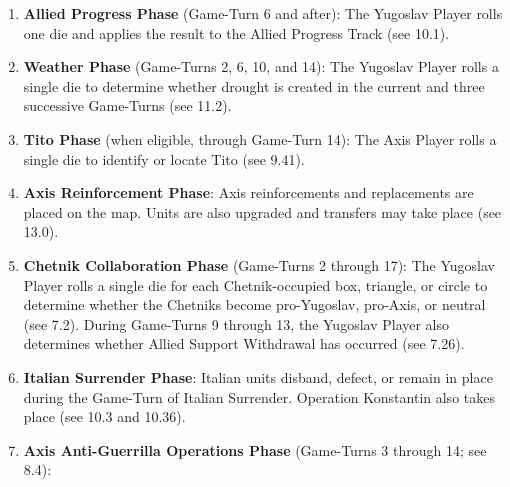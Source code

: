 \begin{enumerate}
  \item \textbf{Allied Progress Phase} (Game-Turn 6 and after): The Yugoslav
  Player rolls one die and applies the result to the Allied Progress Track (see
  10.1).

  \item \textbf{Weather Phase} (Game-Turns 2, 6, 10, and 14): The Yugoslav
  Player rolls a single die to determine whether drought is created in the
  current and three successive Game-Turns (see 11.2).

  \item \textbf{Tito Phase} (when eligible, through Game-Turn 14): The Axis
  Player rolls a single die to identify or locate Tito (see 9.41).

  \item \textbf{Axis Reinforcement Phase}: Axis reinforcements and replacements
  are placed on the map. Units are also upgraded and transfers may take place
  (see 13.0).

  \item \textbf{Chetnik Collaboration Phase} (Game-Turns 2 through 17): The
  Yugoslav Player rolls a single die for each Chetnik-occupied box, triangle,
  or circle to determine whether the Chetniks become pro-Yugoslav, pro-Axis,
  or neutral (see 7.2). During Game-Turns 9 through 13, the Yugoslav Player also
  determines whether Allied Support Withdrawal has occurred (see 7.26).

  \item \textbf{Italian Surrender Phase}: Italian units disband, defect, or
  remain in place during the Game-Turn of Italian Surrender. Operation
  Konstantin also takes place (see 10.3 and 10.36).

  \item \textbf{Axis Anti-Guerrilla Operations Phase} (Game-Turns 3 through
  14; see 8.4):
\end{enumerate}

